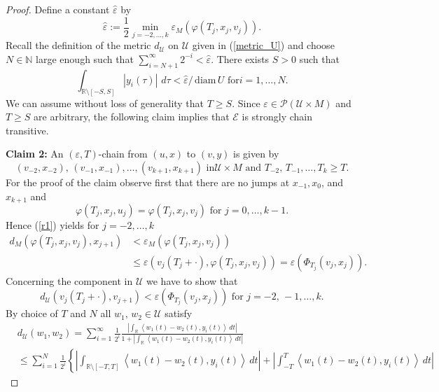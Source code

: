 \documentclass[preprint,12pt]{elsarticle}
\begin{document}
\begin{proof}
Define a constant $\widehat{\varepsilon}$ by%
\[
\widehat{\varepsilon}:=\frac{1}{2}\min_{j=-2,\ldots,k}\varepsilon_{M}%
(\varphi(T_{j},x_{j},v_{j})).
\]
Recall the definition of the metric $d_{\mathcal{U}}$ on $\mathcal{U}$ given
in (\ref{metric_U}) and choose $N\in\mathbb{N}$ large enough such that
$\sum_{i=N+1}^{\infty}2^{-i}<\widehat{\varepsilon}$. There exists $S>0$ such
that%
\[
\int_{\mathbb{R}\setminus\left[  -S,S\right]  }\left\vert y_{i}(\tau
)\right\vert \,\,d\tau<\widehat{\varepsilon}/\mathrm{\,diam}\,U\text{ for
}i=1,\ldots,N.
\]
We can assume without loss of generality that $T\geq S$. Since $\varepsilon
\in\mathcal{P}(\mathcal{U}\times M)$ and $T\geq S$ are arbitrary, the
following claim implies that $\mathcal{E}$ is strongly chain transitive.

\textbf{Claim 2: }An $(\varepsilon,T)$-chain from $(u,x)$ to $(v,y)$ is given
by%
\[
(v_{-2},x_{-2}),\,(v_{-1},x_{-1}),\ldots,(v_{k+1},x_{k+1})\text{ in
}\mathcal{U}\times M\text{ and }T_{-2},\,T_{-1},\ldots,T_{k}\geq T.
\]
For the proof of the claim observe first that there are no jumps at
$x_{-1},x_{0}$, and $x_{k+1}$ and%
\[
\varphi(T_{j},x_{j},u_{j})=\varphi(T_{j},x_{j},v_{j})\text{ for }%
j=0,\ldots,k-1.
\]
Hence (\ref{r1}) yields for $j=-2,\ldots,k$
\begin{align*}
d_{M}(\varphi(T_{j},x_{j},v_{j}),x_{j+1})  &  <\varepsilon_{M}(\varphi
(T_{j},x_{j},v_{j}))\\
&  \leq\varepsilon(v_{j}(T_{j}+\cdot),\varphi(T_{j},x_{j},v_{j}))=\varepsilon
(\Phi_{T_{j}}(v_{j},x_{j})).
\end{align*}
Concerning the component in $\mathcal{U}$ we have to show that%
\begin{equation}
d_{\mathcal{U}}(v_{j}(T_{j}+\cdot),v_{j+1})<\varepsilon(\Phi_{T_{j}}%
(v_{j},x_{j}))\text{ for }j=-2,\,-1,\ldots,k. \label{controls}%
\end{equation}
By choice of $T$ and $N$ all $w_{1},\,w_{2}\in\mathcal{U}$ satisfy%
\begin{align*}
&  d_{\mathcal{U}}(w_{1},w_{2})=\sum_{i=1}^{\infty}\frac{1}{2^{i}}%
\frac{\left\vert \int_{\mathbb{R}}\left\langle w_{1}(t)-w_{2}(t),y_{i}%
(t)\right\rangle \,dt\right\vert }{1+\left\vert \int_{\mathbb{R}}\left\langle
w_{1}(t)-w_{2}(t),y_{i}(t)\right\rangle \,dt\right\vert }\\
&  \leq\sum_{i=1}^{N}\frac{1}{2^{i}}\left\{  \left\vert \int_{\mathbb{R}%
\setminus\left[  -T,T\right]  }\left\langle w_{1}(t)-w_{2}(t),y_{i}%
(t)\right\rangle \,dt\right\vert \right.  +\left.  \left\vert \int_{-T}%
^{T}\left\langle w_{1}(t)-w_{2}(t),y_{i}(t)\right\rangle \,dt\right\vert

\end{align*}
\end{proof}
\end{document}
